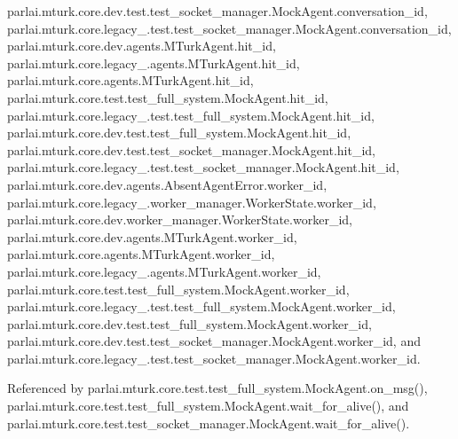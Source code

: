 parlai.\+mturk.\+core.\+dev.\+test.\+test\+\_\+socket\+\_\+manager.\+Mock\+Agent.\+conversation\+\_\+id, parlai.\+mturk.\+core.\+legacy\+\_.\+test.\+test\+\_\+socket\+\_\+manager.\+Mock\+Agent.\+conversation\+\_\+id, parlai.\+mturk.\+core.\+dev.\+agents.\+M\+Turk\+Agent.\+hit\+\_\+id, parlai.\+mturk.\+core.\+legacy\+\_.\+agents.\+M\+Turk\+Agent.\+hit\+\_\+id, parlai.\+mturk.\+core.\+agents.\+M\+Turk\+Agent.\+hit\+\_\+id, parlai.\+mturk.\+core.\+test.\+test\+\_\+full\+\_\+system.\+Mock\+Agent.\+hit\+\_\+id, parlai.\+mturk.\+core.\+legacy\+\_.\+test.\+test\+\_\+full\+\_\+system.\+Mock\+Agent.\+hit\+\_\+id, parlai.\+mturk.\+core.\+dev.\+test.\+test\+\_\+full\+\_\+system.\+Mock\+Agent.\+hit\+\_\+id, parlai.\+mturk.\+core.\+dev.\+test.\+test\+\_\+socket\+\_\+manager.\+Mock\+Agent.\+hit\+\_\+id, parlai.\+mturk.\+core.\+legacy\+\_.\+test.\+test\+\_\+socket\+\_\+manager.\+Mock\+Agent.\+hit\+\_\+id, parlai.\+mturk.\+core.\+dev.\+agents.\+Absent\+Agent\+Error.\+worker\+\_\+id, parlai.\+mturk.\+core.\+legacy\+\_.\+worker\+\_\+manager.\+Worker\+State.\+worker\+\_\+id, parlai.\+mturk.\+core.\+dev.\+worker\+\_\+manager.\+Worker\+State.\+worker\+\_\+id, parlai.\+mturk.\+core.\+dev.\+agents.\+M\+Turk\+Agent.\+worker\+\_\+id, parlai.\+mturk.\+core.\+agents.\+M\+Turk\+Agent.\+worker\+\_\+id, parlai.\+mturk.\+core.\+legacy\+\_.\+agents.\+M\+Turk\+Agent.\+worker\+\_\+id, parlai.\+mturk.\+core.\+test.\+test\+\_\+full\+\_\+system.\+Mock\+Agent.\+worker\+\_\+id, parlai.\+mturk.\+core.\+legacy\+\_.\+test.\+test\+\_\+full\+\_\+system.\+Mock\+Agent.\+worker\+\_\+id, parlai.\+mturk.\+core.\+dev.\+test.\+test\+\_\+full\+\_\+system.\+Mock\+Agent.\+worker\+\_\+id, parlai.\+mturk.\+core.\+dev.\+test.\+test\+\_\+socket\+\_\+manager.\+Mock\+Agent.\+worker\+\_\+id, and parlai.\+mturk.\+core.\+legacy\+\_.\+test.\+test\+\_\+socket\+\_\+manager.\+Mock\+Agent.\+worker\+\_\+id.



Referenced by parlai.\+mturk.\+core.\+test.\+test\+\_\+full\+\_\+system.\+Mock\+Agent.\+on\+\_\+msg(), parlai.\+mturk.\+core.\+test.\+test\+\_\+full\+\_\+system.\+Mock\+Agent.\+wait\+\_\+for\+\_\+alive(), and parlai.\+mturk.\+core.\+test.\+test\+\_\+socket\+\_\+manager.\+Mock\+Agent.\+wait\+\_\+for\+\_\+alive().

